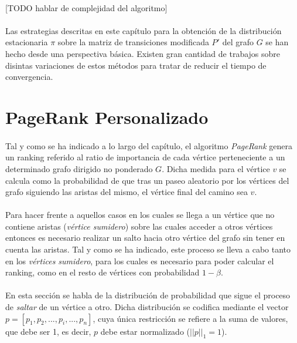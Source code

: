 \documentclass{subfiles}
\begin{document}
        \paragraph{}
        [TODO hablar de complejidad del algoritmo]

      \paragraph{}
      Las estrategias descritas en este capítulo para la obtención de la distribución estacionaria $\pi$ sobre la matriz de transiciones modificada $P'$ del grafo $G$ se han hecho desde una perspectiva básica. Existen gran cantidad de trabajos sobre disintas variaciones de estos métodos para tratar de reducir el tiempo de convergencia.


    \section{PageRank Personalizado}
    \label{sec:pagerank_algorithm_personalized}

      \paragraph{}
      Tal y como se ha indicado a lo largo del capítulo, el algoritmo \emph{PageRank} genera un ranking referido al ratio de importancia de cada vértice perteneciente a un determinado grafo dirigido no ponderado $G$. Dicha medida para el vértice $v$ se calcula como la probabilidad de que tras un paseo aleatorio por los vértices del grafo siguiendo las aristas del mismo, el vértice final del camino sea $v$.

      \paragraph{}
      Para hacer frente a aquellos casos en los cuales se llega a un vértice que no contiene aristas (\emph{vértice sumidero}) sobre las cuales acceder a otros vértices entonces es necesario realizar un salto hacia otro vértice del grafo sin tener en cuenta las aristas. Tal y como se ha indicado, este proceso se lleva a cabo tanto en los \emph{vértices sumidero}, para los cuales es necesario para poder calcular el ranking, como en el resto de vértices con probabilidad $1-\beta$.

      \paragraph{}
      En esta sección se habla de la distribución de probabilidad que sigue el proceso de \emph{saltar} de un vértice a otro. Dicha distribución se codifica mediante el vector $p = [ p_1, p_2,...,p_i,...,p_n ]$, cuya única restricción se refiere a la suma de valores, que debe ser 1, es decir, $p$ debe estar normalizado ($||p||_1 = 1$).
\end{document}
